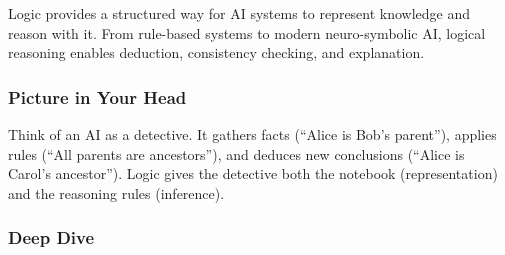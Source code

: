 \documentclass[
  letterpaper,
  DIV=11,
  numbers=noendperiod]{scrreprt}
\begin{document}
Logic provides a structured way for AI systems to represent knowledge
and reason with it. From rule-based systems to modern neuro-symbolic AI,
logical reasoning enables deduction, consistency checking, and
explanation.

\subsubsection{Picture in Your Head}\label{picture-in-your-head-189}

Think of an AI as a detective. It gathers facts (``Alice is Bob's
parent''), applies rules (``All parents are ancestors''), and deduces
new conclusions (``Alice is Carol's ancestor''). Logic gives the
detective both the notebook (representation) and the reasoning rules
(inference).

\subsubsection{Deep Dive}\label{deep-dive-189}
\end{document}
